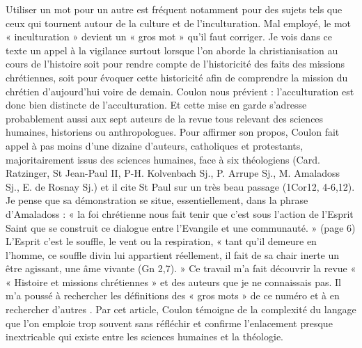 Utiliser un mot pour un autre est fréquent notamment pour des sujets tels que ceux qui tournent autour de la culture et de l’inculturation. Mal employé, le mot « inculturation » devient un « gros mot » qu’il faut corriger. Je vois dans ce texte un appel à la vigilance surtout lorsque l’on aborde la christianisation au cours de l’histoire soit pour rendre compte de l’historicité des faits des missions chrétiennes, soit pour évoquer cette historicité afin de comprendre la mission du chrétien d’aujourd’hui voire de demain. Coulon nous prévient : l’acculturation est donc bien distincte de l’acculturation. Et cette mise en garde s’adresse probablement aussi aux sept auteurs de la revue tous relevant des sciences humaines, historiens ou anthropologues. 
Pour affirmer son propos, Coulon fait appel à pas moins d’une dizaine d’auteurs, catholiques et protestants, majoritairement issus des sciences humaines, face à six théologiens (Card. Ratzinger, St Jean-Paul II, P-H. Kolvenbach Sj., P. Arrupe Sj., M. Amaladoss Sj., E. de Rosnay Sj.) et il cite St Paul sur un très beau passage (1Cor12, 4-6,12). Je pense que sa démonstration se situe, essentiellement, dans la phrase d’Amaladoss : « la foi chrétienne nous fait tenir que c’est sous l’action de l’Esprit Saint que se construit ce dialogue entre l’Evangile et une communauté. » (page 6)  L’Esprit c’est le souffle, le vent ou la respiration, « tant qu’il demeure en l’homme, ce souffle divin lui appartient réellement, il fait de sa chair inerte un être agissant, une âme vivante (Gn 2,7). »  
Ce travail m’a fait découvrir la revue « « Histoire et missions chrétiennes » et des auteurs que je ne connaissais pas.  Il m’a poussé à rechercher les définitions des « gros mots » de ce numéro et à en rechercher d’autres . Par cet article, Coulon témoigne de la complexité du langage que l’on emploie trop souvent sans réfléchir et confirme l’enlacement presque inextricable qui existe entre les sciences humaines et la théologie.   






